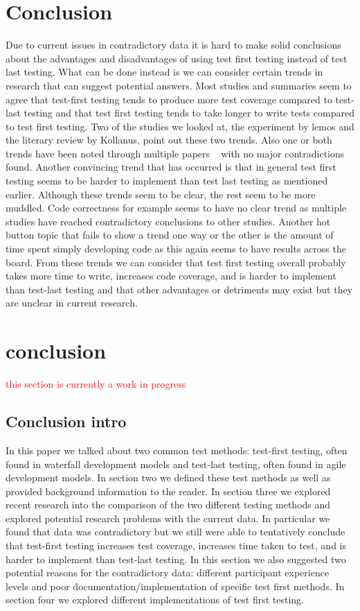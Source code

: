 \documentclass{sig-alternate}
\newcommand{\mycomment}[1]{\textcolor{red}{#1}}
\begin{document}
\section{Conclusion}

Due to current issues in contradictory data it is hard to make solid conclusions about the advantages and disadvantages of using test first testing instead of test last testing.  What can be done instead is we can consider certain trends in research that can suggest potential answers.  Most studies and summaries seem to agree that test-first testing tends to produce more test coverage compared to test-last testing and that test first testing tends to take longer to write tests compared to test first testing.  Two of the studies we looked at, the experiment by lemos and the literary review by Kollanus, point out these two trends.  Also one or both trends have been noted through multiple papers ~\cite{Kettunen:2010, Hammond:2012, Hellman:2012} with no major contradictions found.  Another convincing trend that has occurred is that in general test first testing seems to be harder to implement than test last testing as mentioned earlier.   Although these trends seem to be clear, the rest seem to be more muddled.  Code correctness for example seems to have no clear trend as multiple studies have reached contradictory conclusions to other studies.  Another hot button topic that fails to show a trend one way or the other is the amount of time spent simply developing code as this again seems to have results across the board.  From these trends we can consider that test first testing overall probably takes more time to write, increases code coverage, and is harder to implement than test-last testing and that other advantages or detriments may exist but they are unclear in current research.

\section{conclusion}
\mycomment{this section is currently a work in progress}
\subsection{Conclusion intro}

In this paper we talked about two common test methods: test-first testing, often found in waterfall development models and test-last testing, often found in agile development models.  In section two we defined these test methods as well as provided background information to the reader.  In section three we explored recent research into the comparison of the two different testing methods and explored potential research problems with the current data.  In particular we found that data was contradictory but we still were able to tentatively conclude that test-first testing increases test coverage, increases time taken to test, and is harder to implement than test-last testing.  In this section we also suggested two potential reasons for the contradictory data: different participant experience levels and poor documentation/implementation of specific test first methods. In section four we explored different implementations of test first testing.  
\end{document}
